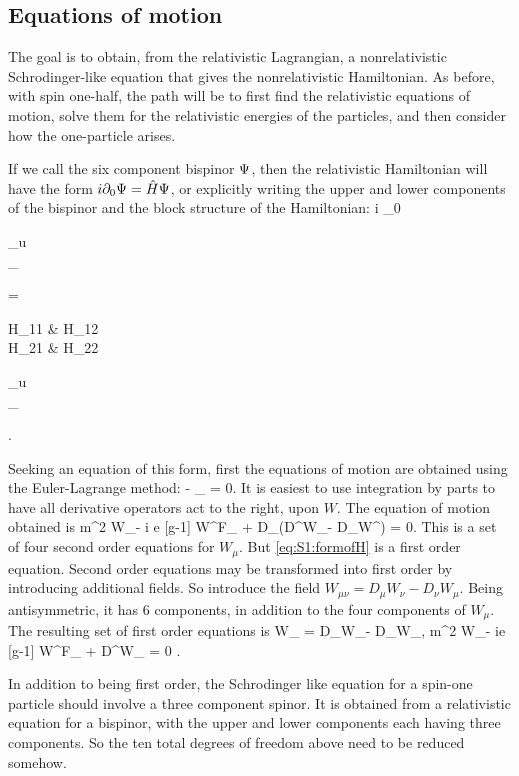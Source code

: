 \subsection{Equations of motion}
The goal is to obtain, from the relativistic Lagrangian, a nonrelativistic Schrodinger-like equation that gives the nonrelativistic Hamiltonian.  As before, with spin one-half, the path will be to first find the relativistic equations of motion, solve them for the relativistic energies of the particles, and then consider how the one-particle arises.


If we call the six component bispinor $\Psi$, then the relativistic Hamiltonian will have the form $i \partial_0 \Psi = \hat{H} \Psi$, or explicitly writing the upper and lower components of the bispinor and the block structure of the Hamiltonian:
\beq \label{eq:S1:formofH}
	i \partial_0 \begin{pmatrix} \Psig_u \\ \Psig_\ell \end{pmatrix} 
		= \begin{pmatrix} H_{11} & H_{12} \\ H_{21} & H_{22} \end{pmatrix} \begin{pmatrix} \Psig_u \\ \Psig_\ell \end{pmatrix}.
\eeq 


Seeking an equation of this form, first the equations of motion are obtained using the Euler-Lagrange method:
\beq
	 - \partial_\mu {} = 0.
\eeq
It is easiest to use integration by parts to have all derivative operators act to the right, upon $W$.  The equation of motion obtained is
\beq \label{eq:S1:ELeq}
		m^2 W_\alpha - i e [g-1] W^\nu F_{\alpha \nu} + D_\mu (D^\mu W_\alpha - D_\alpha W^\mu) = 0.
\eeq
This is a set of four second order equations for $W_\mu$.  But \eqref{eq:S1:formofH} is a first order equation.  Second order equations may be transformed into first order by introducing additional fields.  So introduce the field $W_{\mu\nu} = D_\mu W_\nu - D_\nu W_\mu$.  Being antisymmetric, it has 6 components, in addition to the four components of $W_\mu$.  The resulting set of first order equations is
\beq \label{eq:S1:ELeqA}
	W_{\mu\nu} = D_\mu W_\nu - D_\nu W_\mu,
\eeq
\beq \label{eq:S1:ELeqB}
	m^2 W_\alpha - ie [g-1] W^\nu F_{\alpha \nu} + D^\mu W_{\mu \alpha} = 0	.
\eeq

In addition to being first order, the Schrodinger like equation for a spin-one particle should involve a three component spinor.  It is obtained from a relativistic equation for a bispinor, with the upper and lower components each having three components.  So the ten total degrees of freedom above need to be reduced somehow.


